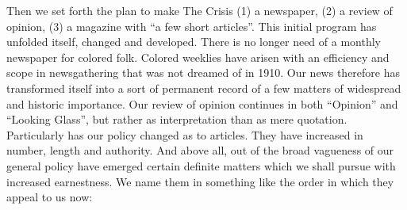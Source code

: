 \documentclass[letterpaper,10pt,english]{jupyterBook}
\begin{document}
\sphinxAtStartPar
Then we set forth the plan to make The Crisis (1) a newspaper, (2) a review of opinion, (3) a magazine with “a few short articles”. This initial program has unfolded itself, changed and developed. There is no longer need of a monthly newspaper for colored folk. Colored weeklies have arisen with an efficiency and scope in news\sphinxhyphen{}gathering that was not dreamed of in 1910. Our news therefore has transformed itself into a sort of permanent record of a few matters of widespread and historic importance. Our review of opinion continues in both “Opinion” and “Looking Glass”, but rather as interpretation than as mere quotation. Particularly has our policy changed as to articles. They have increased in number, length and authority. And above all, out of the broad vagueness of our general policy have emerged certain definite matters which we shall pursue with increased earnestness. We name them in something like the order in which they appeal to us now:
\end{document}

